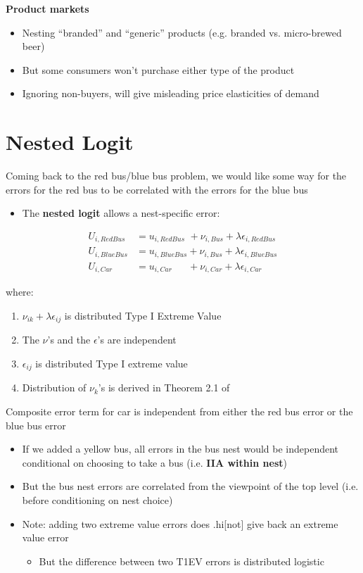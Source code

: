 \documentclass[11pt]{article}
\begin{document}
\textbf{Product markets}
\begin{itemize}
\item Nesting ``branded'' and ``generic'' products (e.g. branded vs. micro-brewed beer)
\item But some consumers won't purchase either type of the product
\item Ignoring non-buyers, will give misleading price elasticities of demand
\end{itemize}

\section{Nested Logit}
\label{sec:org111c550}

Coming back to the red bus/blue bus problem, we would like some way for the errors for the red bus to be correlated with the errors for the blue bus
\begin{itemize}
\item The \textbf{nested logit} allows a nest-specific error:
\end{itemize}

\begin{align*}
U_{i,RedBus}&=u_{i,RedBus\phantom{e}}+\nu_{i,Bus}+\lambda\epsilon_{i,RedBus}\\
U_{i,BlueBus}&=u_{i,BlueBus}+\nu_{i,Bus}+\lambda\epsilon_{i,BlueBus}\\
U_{i,Car}&=u_{i,Car\phantom{eBus}}+\nu_{i,Car}+\lambda\epsilon_{i,Car}
\end{align*}

where:

\begin{enumerate}
\item \(\nu_{ik}+\lambda\epsilon_{ij}\) is distributed Type I Extreme Value
\item The \(\nu\)'s and the \(\epsilon\)'s are independent
\item \(\epsilon_{ij}\) is distributed Type I extreme value
\item Distribution of \(\nu_k\)'s is derived in Theorem 2.1 of \textcite{cardell1997}
\end{enumerate}

Composite error term for car is independent from either the red bus error or the blue bus error  

\begin{itemize}
\item If we added a yellow bus, all errors in the bus nest would be independent conditional on choosing to take a bus (i.e. \textbf{IIA within nest})
\item But the bus nest errors are correlated from the viewpoint of the top level (i.e. before conditioning on nest choice)
\item Note: adding two extreme value errors does .hi[not] give back an extreme value error
\begin{itemize}
\item But the difference between two T1EV errors is distributed logistic
\end{itemize}
\end{itemize}
\end{document}
